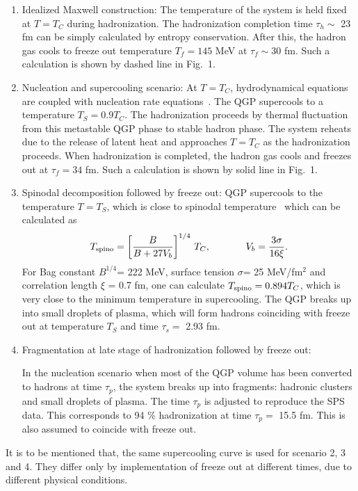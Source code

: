 \begin{enumerate}

\item Idealized Maxwell construction:
    The temperature of the system is held fixed at $T=T_C$ 
    during hadronization. The hadronization completion time 
    $\tau_h\sim$ 23 fm can be simply calculated by entropy conservation.
    After this, the hadron gas cools to freeze out temperature 
    $T_f=145$ MeV at $\tau_f\sim 30$ fm. Such a calculation is shown by 
    dashed line in Fig.~1.

\item  Nucleation and supercooling scenario:
   At $T=T_C$, hydrodynamical equations are coupled with nucleation 
  rate equations~\cite{SPINO}. The QGP supercools to a temperature 
  $T_S=0.9T_C$. The hadronization proceeds by 
 thermal fluctuation from this metastable QGP phase to stable hadron phase. 
 The system reheats due to the release of latent heat and approaches
 $T=T_C$ as the hadronization proceeds. When hadronization is completed,  
 the hadron gas cools and freezes out at $\tau_f=34$ fm.
 Such a calculation is shown by solid line in Fig.~1.

\item Spinodal decomposition followed by freeze out:
  QGP supercools to the temperature $T=T_S$, which is close to spinodal 
  temperature~\cite{SPINO} which can be calculated as 
\begin{equation} 
T_{\rm spino}= \left[{B \over B+ 27 V_b} \right]^{1/4} \, T_C, 
  \hspace{.5in} V_b = {3\sigma \over 16 \xi}.
\end{equation}
For Bag constant $B^{1/4}$= 222 MeV,
surface tension $\sigma$= 25 MeV/fm$^2$ and correlation length $\xi$ = 0.7 fm,
one can calculate 
$T_{\rm spino}=0.894 T_C$, which is very close to the minimum temperature
in supercooling. 
 The QGP breaks up into small droplets of plasma, which will form 
hadrons coinciding with freeze out at temperature $T_S$ and
time $\tau_s=$ 2.93 fm.


\item Fragmentation at late stage of hadronization followed by freeze out:

  In the nucleation scenario when most of the QGP volume has been 
converted to hadrons at time $\tau_p$, the system breaks up into fragments: 
hadronic clusters and small droplets of plasma. 
 The time $\tau_p$ is adjusted to reproduce the SPS data. This 
corresponds to 94 \%  hadronization at time $\tau_p=$ 15.5 fm.
This is also assumed to coincide with freeze out.
\end{enumerate}
 It is to be mentioned that, the same supercooling curve is used for 
scenario 2, 3 and 4. They differ only by implementation of freeze
out at different times, due to different physical conditions.




